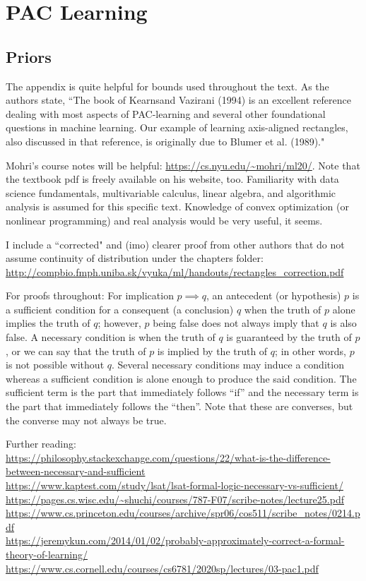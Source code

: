 \chapter{PAC Learning}

\section{Priors}

The appendix is quite helpful for bounds used throughout the text. As the
authors state, ``The book of Kearnsand Vazirani (1994) is an excellent
reference dealing with most aspects of PAC-learning and several other
foundational questions in machine learning. Our example
of learning axis-aligned rectangles, also discussed in that reference, is
originally due to Blumer et al. (1989)."

Mohri's course notes will be helpful: \url{https://cs.nyu.edu/~mohri/ml20/}.
Note that the textbook pdf is freely available on his website, too. Familiarity
with data science fundamentals, multivariable calculus, linear algebra, and
algorithmic analysis is assumed for this specific text. Knowledge of convex
optimization (or nonlinear programming) and real analysis would be very useful,
it seems.

I include a ``corrected" and (imo) clearer proof from other authors that do not
assume continuity of distribution under the chapters folder:
\url{http://compbio.fmph.uniba.sk/vyuka/ml/handouts/rectangles_correction.pdf}

For proofs throughout: For implication $p \implies q$, an antecedent (or
hypothesis) $p$ is a sufficient condition for a consequent (a conclusion) $q$
when the truth of $p$ alone implies the truth of $q$; however, $p$ being false
does not always imply that $q$ is also false. A necessary condition is when the
truth of $q$ is guaranteed by the truth of $p$, or we can say that the truth of
$p$ is implied
by the truth of $q$; in other words, $p$ is not possible without $q$. Several
necessary conditions may induce a condition whereas a sufficient condition is
alone enough to produce the said condition. The sufficient term is the part
that immediately follows ``if'' and the necessary term is the part that
immediately
follows the ``then''. Note that these are converses, but the converse may not
always be true.

Further reading:\\
\url{https://philosophy.stackexchange.com/questions/22/what-is-the-difference-between-necessary-and-sufficient}\\
\url{https://www.kaptest.com/study/lsat/lsat-formal-logic-necessary-vs-sufficient/}\\
\url{https://pages.cs.wisc.edu/~shuchi/courses/787-F07/scribe-notes/lecture25.pdf}\\
\url{https://www.cs.princeton.edu/courses/archive/spr06/cos511/scribe_notes/0214.pdf}\\
\url{https://jeremykun.com/2014/01/02/probably-approximately-correct-a-formal-theory-of-learning/}\\
\url{https://www.cs.cornell.edu/courses/cs6781/2020sp/lectures/03-pac1.pdf}\\
